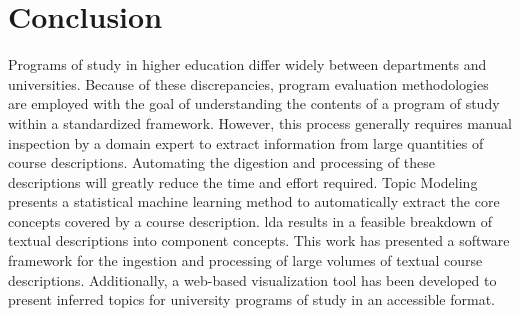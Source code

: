 \section{Conclusion}
\label{sec:conclusion}


Programs of study in higher education differ widely between departments and universities.
Because of these discrepancies, program evaluation methodologies are employed with the goal of understanding the contents of a program of study within a standardized framework.
However, this process generally requires manual inspection by a domain expert to extract information from large quantities of course descriptions.
Automating the digestion and processing of these descriptions will greatly reduce the time and effort required.
Topic Modeling presents a statistical machine learning method to automatically extract the core concepts covered by a course description.
\acf{lda} results in a feasible breakdown of textual descriptions into component concepts.
This work has presented a software framework for the ingestion and processing of large volumes of textual course descriptions.
Additionally, a web-based visualization tool has been developed to present inferred topics for university programs of study in an accessible format.


